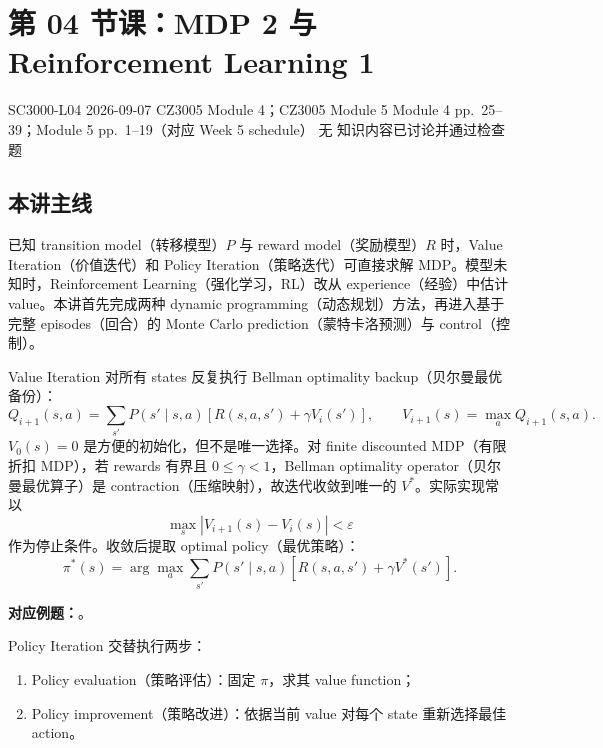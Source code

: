 
\section{第 04 节课：MDP 2 与 Reinforcement Learning 1}
\label{lecture:SC3000-L04}

\lecturemeta
  {SC3000-L04}
  {2026-09-07}
  {CZ3005 Module 4；CZ3005 Module 5}
  {Module 4 pp.~25--39；Module 5 pp.~1--19（对应 Week 5 schedule）}
  {无}
  {知识内容已讨论并通过检查题}

\subsection{本讲主线}

已知 transition model（转移模型）$P$ 与 reward model（奖励模型）$R$ 时，Value Iteration（价值迭代）和 Policy Iteration（策略迭代）可直接求解 MDP。模型未知时，Reinforcement Learning（强化学习，RL）改从 experience（经验）中估计 value。本讲首先完成两种 dynamic programming（动态规划）方法，再进入基于完整 episodes（回合）的 Monte Carlo prediction（蒙特卡洛预测）与 control（控制）。


Value Iteration 对所有 states 反复执行 Bellman optimality backup（贝尔曼最优备份）：
\[
  Q_{i+1}(s,a)=\sum_{s'}P(s'\mid s,a)
  \left[R(s,a,s')+\gamma V_i(s')\right],
  \qquad
  \boxed{V_{i+1}(s)=\max_a Q_{i+1}(s,a)}.
\]
$V_0(s)=0$ 是方便的初始化，但不是唯一选择。对 finite discounted MDP（有限折扣 MDP），若 rewards 有界且 $0\le\gamma<1$，Bellman optimality operator（贝尔曼最优算子）是 contraction（压缩映射），故迭代收敛到唯一的 $V^*$。实际实现常以
\[
  \max_s\left|V_{i+1}(s)-V_i(s)\right|<\varepsilon
\]
作为停止条件。收敛后提取 optimal policy（最优策略）：
\[
  \pi^*(s)=\arg\max_a\sum_{s'}P(s'\mid s,a)
  \left[R(s,a,s')+\gamma V^*(s')\right].
\]

\textbf{对应例题：}。


Policy Iteration 交替执行两步：

\begin{enumerate}
  \item Policy evaluation（策略评估）：固定 $\pi$，求其 value function；
  \item Policy improvement（策略改进）：依据当前 value 对每个 state 重新选择最佳 action。
\end{enumerate}

